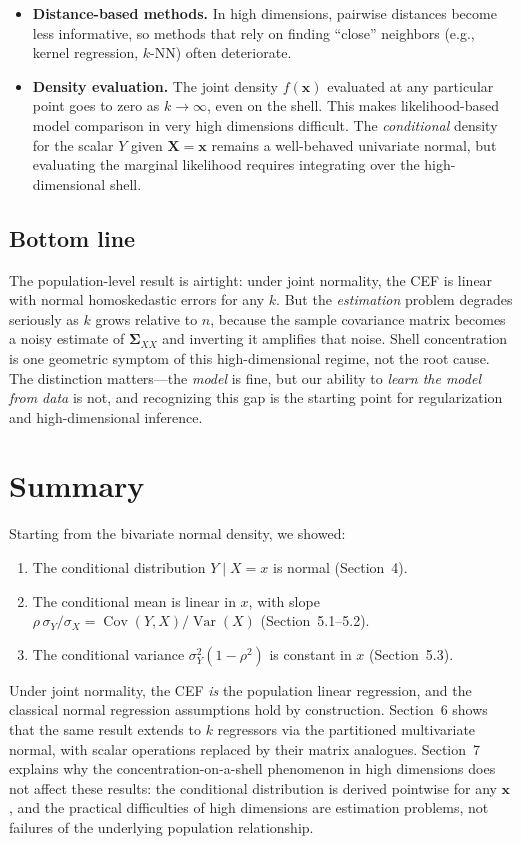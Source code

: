 \documentclass[11pt]{article}
\newcommand{\Var}{\operatorname{Var}}
\newcommand{\Cov}{\operatorname{Cov}}
\begin{document}
\begin{itemize}[leftmargin=2em]
\item \textbf{Distance-based methods.}  In high dimensions, pairwise distances become less informative, so methods that rely on finding ``close'' neighbors (e.g., kernel regression, $k$-NN) often deteriorate.

\item \textbf{Density evaluation.}  The joint density $f(\bm{x})$ evaluated at any particular point goes to zero as $k\to\infty$, even on the shell.  This makes likelihood-based model comparison in very high dimensions difficult.  The \emph{conditional} density for the scalar $Y$ given $\bm{X}=\bm{x}$ remains a well-behaved univariate normal, but evaluating the marginal likelihood requires integrating over the high-dimensional shell.
\end{itemize}

\subsection{Bottom line}

The population-level result is airtight: under joint normality, the CEF is linear with normal homoskedastic errors for any $k$.  But the \emph{estimation} problem degrades seriously as $k$ grows relative to $n$, because the sample covariance matrix becomes a noisy estimate of $\bm{\Sigma}_{XX}$ and inverting it amplifies that noise.  Shell concentration is one geometric symptom of this high-dimensional regime, not the root cause.  The distinction matters---the \emph{model} is fine, but our ability to \emph{learn the model from data} is not, and recognizing this gap is the starting point for regularization and high-dimensional inference.

\section{Summary}

Starting from the bivariate normal density, we showed:
\begin{enumerate}[leftmargin=2em]
\item The conditional distribution $Y\mid X=x$ is normal (Section~4).
\item The conditional mean is linear in $x$, with slope $\rho\,\sigma_Y/\sigma_X = \Cov(Y,X)/\Var(X)$ (Section~5.1--5.2).
\item The conditional variance $\sigma_Y^2(1-\rho^2)$ is constant in $x$ (Section~5.3).
\end{enumerate}
Under joint normality, the CEF \emph{is} the population linear regression, and the classical normal regression assumptions hold by construction.  Section~6 shows that the same result extends to $k$ regressors via the partitioned multivariate normal, with scalar operations replaced by their matrix analogues.  Section~7 explains why the concentration-on-a-shell phenomenon in high dimensions does not affect these results: the conditional distribution is derived pointwise for any $\bm{x}$, and the practical difficulties of high dimensions are estimation problems, not failures of the underlying population relationship.
\end{document}
